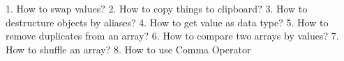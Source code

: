 1. How to swap values?
2. How to copy things to clipboard?
3. How to destructure objects by aliases?
4. How to get value as data type?
5. How to remove duplicates from an array?
6. How to compare two arrays by values?
7. How to shuffle an array?
8. How to use Comma Operator